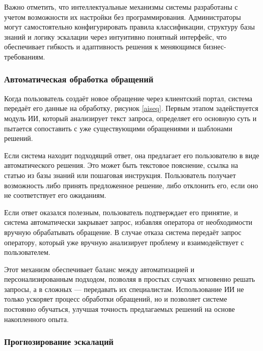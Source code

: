 
Важно отметить, что интеллектуальные механизмы системы разработаны с учетом возможности их настройки без программирования. Администраторы могут самостоятельно конфигурировать правила классификации, структуру базы знаний и логику эскалации через интуитивно понятный интерфейс, что обеспечивает гибкость и адаптивность решения к меняющимся бизнес-требованиям.

\subsubsection{Автоматическая обработка обращений}

Когда пользователь создаёт новое обращение через клиентский портал, система передаёт его данные на обработку, рисунок \ref{aiseq}. Первым этапом задействуется модуль ИИ, который анализирует текст запроса, определяет его основную суть и пытается сопоставить с уже существующими обращениями и шаблонами решений.


Если система находит подходящий ответ, она предлагает его пользователю в виде автоматического решения. Это может быть текстовое пояснение, ссылка на статью из базы знаний или пошаговая инструкция. Пользователь получает возможность либо принять предложенное решение, либо отклонить его, если оно не соответствует его ожиданиям.

Если ответ оказался полезным, пользователь подтверждает его принятие, и система автоматически закрывает запрос, избавляя оператора от необходимости вручную обрабатывать обращение. В случае отказа система передаёт запрос оператору, который уже вручную анализирует проблему и взаимодействует с пользователем.

Этот механизм обеспечивает баланс между автоматизацией и персонализированным подходом, позволяя в простых случаях мгновенно решать запросы, а в сложных — передавать их специалистам. Использование ИИ не только ускоряет процесс обработки обращений, но и позволяет системе постоянно обучаться, улучшая точность предлагаемых решений на основе накопленного опыта.

\subsubsection{Прогнозирование эскалаций}

